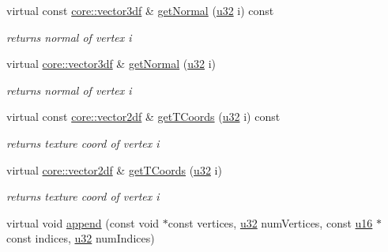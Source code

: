 \begin{DoxyCompactItemize}
virtual const \hyperlink{namespaceirr_1_1core_a06f169d08b5c429f5575acb7edbad811}{core\+::vector3df} \& \hyperlink{classirr_1_1scene_1_1CMeshBuffer_ac93c92c49e801141cab699484bcf818d}{get\+Normal} (\hyperlink{namespaceirr_a0416a53257075833e7002efd0a18e804}{u32} i) const
\begin{DoxyCompactList}\small\item\em returns normal of vertex i \end{DoxyCompactList}\item 
\mbox{\label{classirr_1_1scene_1_1CMeshBuffer_ad8515509517384dc31e9ad46eea323a0}} 
virtual \hyperlink{namespaceirr_1_1core_a06f169d08b5c429f5575acb7edbad811}{core\+::vector3df} \& \hyperlink{classirr_1_1scene_1_1CMeshBuffer_ad8515509517384dc31e9ad46eea323a0}{get\+Normal} (\hyperlink{namespaceirr_a0416a53257075833e7002efd0a18e804}{u32} i)
\begin{DoxyCompactList}\small\item\em returns normal of vertex i \end{DoxyCompactList}\item 
\mbox{\label{classirr_1_1scene_1_1CMeshBuffer_a2823a97a353b6909e66a18dca46a8f30}} 
virtual const \hyperlink{namespaceirr_1_1core_a2cf08556d77f6f5a792973a6e27ed11b}{core\+::vector2df} \& \hyperlink{classirr_1_1scene_1_1CMeshBuffer_a2823a97a353b6909e66a18dca46a8f30}{get\+T\+Coords} (\hyperlink{namespaceirr_a0416a53257075833e7002efd0a18e804}{u32} i) const
\begin{DoxyCompactList}\small\item\em returns texture coord of vertex i \end{DoxyCompactList}\item 
\mbox{\label{classirr_1_1scene_1_1CMeshBuffer_a50e1a283111e3aa8325a7e774f08fb27}} 
virtual \hyperlink{namespaceirr_1_1core_a2cf08556d77f6f5a792973a6e27ed11b}{core\+::vector2df} \& \hyperlink{classirr_1_1scene_1_1CMeshBuffer_a50e1a283111e3aa8325a7e774f08fb27}{get\+T\+Coords} (\hyperlink{namespaceirr_a0416a53257075833e7002efd0a18e804}{u32} i)
\begin{DoxyCompactList}\small\item\em returns texture coord of vertex i \end{DoxyCompactList}\item 
virtual void \hyperlink{classirr_1_1scene_1_1CMeshBuffer_a7efd85cba5d5d86bee8c2ea2fe0524d9}{append} (const void $\ast$const vertices, \hyperlink{namespaceirr_a0416a53257075833e7002efd0a18e804}{u32} num\+Vertices, const \hyperlink{namespaceirr_ae9f8ec82692ad3b83c21f555bfa70bcc}{u16} $\ast$const indices, \hyperlink{namespaceirr_a0416a53257075833e7002efd0a18e804}{u32} num\+Indices)

\end{DoxyCompactItemize}
